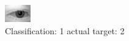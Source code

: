 \begin{figure}[h!]
\begin{center}
\includegraphics[width=0.60\columnwidth]{figures/ID494_class_1_target_2.png}
\end{center}
\caption{ Classification: 1 actual target: 2}
\label{fig:ID494_class_1_target_2}
\end{figure}
